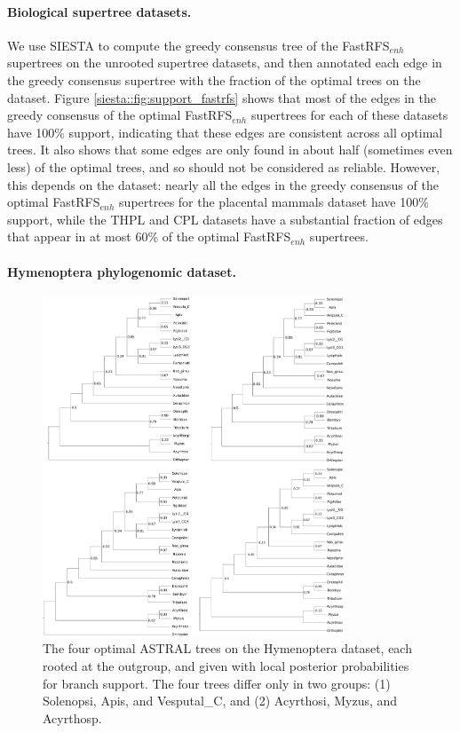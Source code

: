 \paragraph{Biological supertree datasets. }
We use SIESTA to compute the greedy consensus tree of the FastRFS$_{enh}$ supertrees on the unrooted supertree datasets, and then annotated each edge in the greedy consensus supertree with the fraction of the optimal trees  on the dataset.
Figure \ref{siesta::fig:support_fastrfs} shows that most of the edges in the greedy consensus of the optimal FastRFS$_{enh}$ supertrees for each of these datasets have 100\% support, indicating that these edges are consistent across all optimal trees.
It also shows that some  edges are only found in about half (sometimes even less) of the optimal trees, and so should not be considered as reliable.
However, this depends on the dataset:  nearly all the edges in the greedy consensus of the optimal FastRFS$_{enh}$ supertrees for the placental mammals dataset have 100\% support, while the THPL and CPL datasets have a substantial fraction of edges that appear in at most 60\% of the optimal FastRFS$_{enh}$ supertrees.

  
\paragraph{Hymenoptera phylogenomic dataset. }

\begin{figure}[!ht]
\includegraphics[width=0.8\textwidth]{siesta-figs/hymenoptera}
\caption[Four optimal ASTRAL trees on biological Hymenoptera dataset]{The four optimal ASTRAL trees on the Hymenoptera dataset, each rooted at the outgroup, and given with local posterior probabilities for branch support. The four trees differ only in two groups: (1) Solenopsi, Apis, and Vesputal\_C, and (2) Acyrthosi, Myzus, and Acyrthosp. }\label{siesta::fig:hymenoptera-optimal}
\end{figure}

